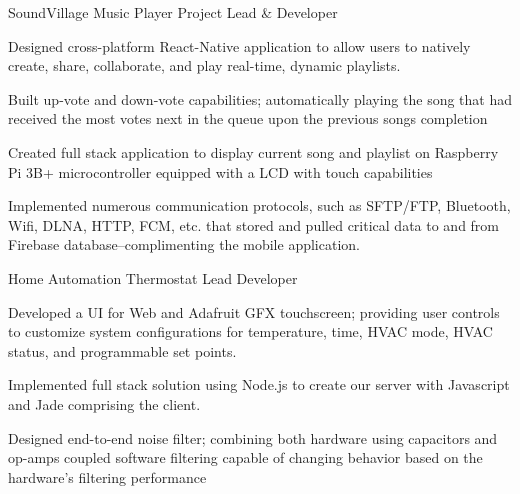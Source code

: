 

\begin{cventries}

  \cventry
    {} %
    {SoundVillage Music Player} %
    {Project Lead \& Developer}
    {}
    {
      \begin{cvitems} %
        \item {Designed cross-platform React-Native application to allow users to natively create, share, collaborate, and play real-time, dynamic playlists.}
        \item {Built up-vote and down-vote capabilities; automatically playing the song that had received the most votes next in the queue upon the previous songs completion}
        \item {Created full stack application to display current song and playlist on Raspberry Pi 3B+ microcontroller equipped with a LCD with touch capabilities}
        \item {Implemented numerous communication protocols, such as SFTP/FTP, Bluetooth, Wifi, DLNA, HTTP, FCM, etc. that stored and pulled critical data to and from Firebase database--complimenting the mobile application.}
      \end{cvitems}
    }

  \cventry
    {} %
    {Home Automation Thermostat} %
    {Lead Developer}
    {}
    {
      \begin{cvitems} %
        \item {Developed a UI for Web and Adafruit GFX touchscreen; providing user controls to customize system configurations for temperature, time, HVAC mode, HVAC status, and programmable set points.}
        \item {Implemented full stack solution using Node.js to create our server with Javascript and Jade comprising the client.}
        \item {Designed end-to-end noise filter; combining both hardware using capacitors and op-amps coupled software filtering capable of changing behavior based on the hardware's filtering performance
        }
      \end{cvitems}
    }
    

\end{cventries}
